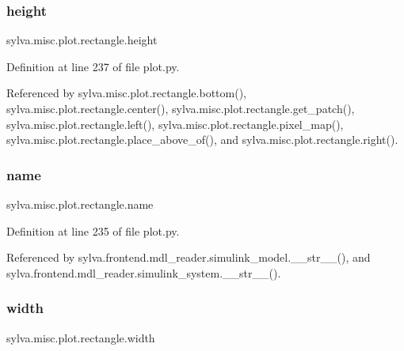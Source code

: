 \subsubsection{\texorpdfstring{height}{height}}
{\footnotesize\ttfamily sylva.\+misc.\+plot.\+rectangle.\+height}



Definition at line 237 of file plot.\+py.



Referenced by sylva.\+misc.\+plot.\+rectangle.\+bottom(), sylva.\+misc.\+plot.\+rectangle.\+center(), sylva.\+misc.\+plot.\+rectangle.\+get\+\_\+patch(), sylva.\+misc.\+plot.\+rectangle.\+left(), sylva.\+misc.\+plot.\+rectangle.\+pixel\+\_\+map(), sylva.\+misc.\+plot.\+rectangle.\+place\+\_\+above\+\_\+of(), and sylva.\+misc.\+plot.\+rectangle.\+right().

\mbox{\label{classsylva_1_1misc_1_1plot_1_1rectangle_aea9a12e78d03675a8af2682b9bbd656b}} 
\subsubsection{\texorpdfstring{name}{name}}
{\footnotesize\ttfamily sylva.\+misc.\+plot.\+rectangle.\+name}



Definition at line 235 of file plot.\+py.



Referenced by sylva.\+frontend.\+mdl\+\_\+reader.\+simulink\+\_\+model.\+\_\+\+\_\+str\+\_\+\+\_\+(), and sylva.\+frontend.\+mdl\+\_\+reader.\+simulink\+\_\+system.\+\_\+\+\_\+str\+\_\+\+\_\+().

\mbox{\label{classsylva_1_1misc_1_1plot_1_1rectangle_ad81773b097d59cb5c67b7e06ab6c022c}} 
\subsubsection{\texorpdfstring{width}{width}}
{\footnotesize\ttfamily sylva.\+misc.\+plot.\+rectangle.\+width}



